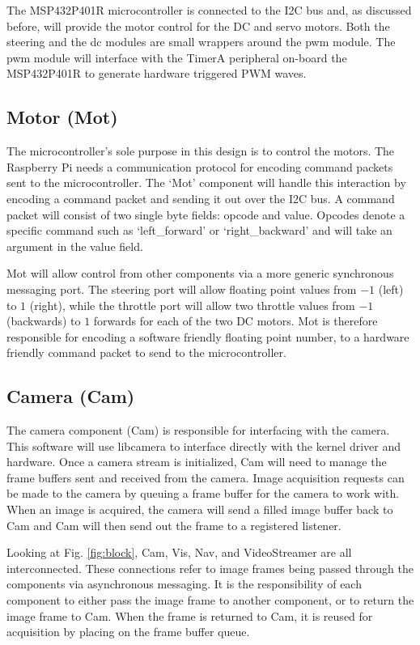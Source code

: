 \documentclass{article}
\begin{document}
The MSP432P401R microcontroller is connected to the I2C bus and, as discussed before, will provide the motor control for the DC and servo motors. Both the steering and the dc modules are small wrappers around the pwm module. The pwm module will interface with the TimerA peripheral on-board the MSP432P401R to generate hardware triggered PWM waves.

\subsection{Motor (Mot)}

The microcontroller's sole purpose in this design is to control the motors. The Raspberry Pi needs a communication protocol for encoding command packets sent to the microcontroller. The `Mot' component will handle this interaction by encoding a command packet and sending it out over the I2C bus. A command packet will consist of two single byte fields: opcode and value. Opcodes denote a specific command such as `left\_forward' or `right\_backward' and will take an argument in the value field.

Mot will allow control from other components via a more generic synchronous
messaging port. The steering port will allow floating point values from $-1$ (left) to $1$ (right), while the throttle port will allow two throttle values from $-1$ (backwards) to $1$ forwards for each of the two DC motors. Mot is therefore responsible for encoding a software friendly floating point number, to a hardware friendly command packet to send to the microcontroller.

\subsection{Camera (Cam)}

The camera component (Cam) is responsible for interfacing with the camera. This software will use libcamera to interface directly with the kernel driver and hardware. Once a camera stream is initialized, Cam will need to manage the frame buffers sent and received from the camera. Image acquisition requests can be made to the camera by queuing a frame buffer for the camera to work with. When an image is acquired, the camera will send a filled image buffer back to Cam and Cam will then send out the frame to a registered listener.

Looking at Fig. \ref{fig:block}, Cam, Vis, Nav, and VideoStreamer are all interconnected. These connections refer to image frames being passed through the components via asynchronous messaging. It is the responsibility of each component to either pass the image frame to another component, or to return the image frame to Cam. When the frame is returned to Cam, it is reused for acquisition by placing on the frame buffer queue.
\end{document}
